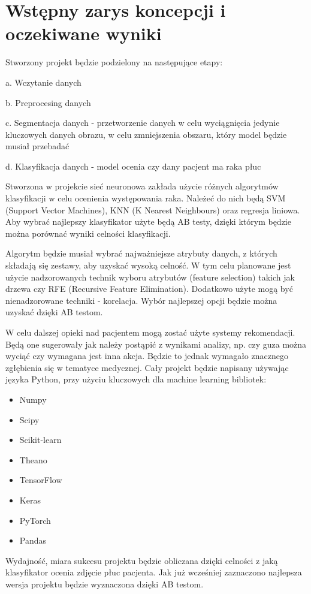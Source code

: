 \documentclass[10pt]{article}
\begin{document}
\section{Wstępny zarys koncepcji i oczekiwane wyniki}
Stworzony projekt będzie podzielony na następujące etapy:

a. Wczytanie danych

b. Preprocesing danych

c. Segmentacja danych - przetworzenie danych w celu wyciągnięcia jedynie kluczowych danych obrazu, w celu zmniejszenia obszaru, który model będzie musiał przebadać

d. Klasyfikacja danych - model ocenia czy dany pacjent ma raka płuc

Stworzona w projekcie sieć neuronowa zakłada użycie różnych algorytmów klasyfikacji w celu ocenienia występowania raka. Należeć do nich będą SVM (Support Vector Machines), KNN (K Nearest Neighbours) oraz regresja liniowa. Aby wybrać najlepszy klasyfikator użyte będą $\mathrm{AB}$ testy, dzięki którym będzie można porównać wyniki celności klasyfikacji.

Algorytm będzie musiał wybrać najważniejsze atrybuty danych, z których składają się zestawy, aby uzyskać wysoką celność. W tym celu planowane jest użycie nadzorowanych technik wyboru atrybutów (feature selection) takich jak drzewa czy RFE (Recursive Feature Elimination). Dodatkowo użyte mogą być nienadzorowane techniki - korelacja. Wybór najlepszej opcji będzie można uzyskać dzięki AB testom.

W celu dalszej opieki nad pacjentem mogą zostać użyte systemy rekomendacji. Będą one sugerowały jak należy postąpić z wynikami analizy, np. czy guza można wyciąć czy wymagana jest inna akcja. Będzie to jednak wymagało znacznego zgłębienia się w tematyce medycznej. Cały projekt będzie napisany używając języka Python, przy użyciu kluczowych dla machine learning bibliotek:

\begin{itemize}
  \item Numpy

  \item Scipy

  \item Scikit-learn

  \item Theano

  \item TensorFlow

  \item Keras

  \item PyTorch

  \item Pandas

\end{itemize}
Wydajność, miara sukcesu projektu będzie obliczana dzięki celności z jaką klasyfikator ocenia zdjęcie płuc pacjenta. Jak już wcześniej zaznaczono najlepsza wersja projektu będzie wyznaczona dzięki AB testom.
\end{document}
